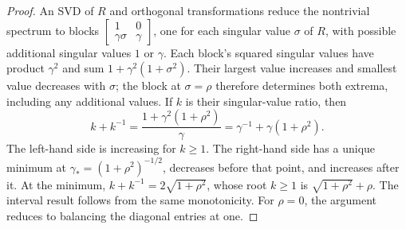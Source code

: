 \begin{proof}
An SVD of $R$ and orthogonal transformations reduce the nontrivial spectrum to
blocks $\left[\begin{smallmatrix}1&0\\\gamma\sigma&\gamma\end{smallmatrix}\right]$,
one for each singular value $\sigma$ of $R$, with possible additional singular
values $1$ or $\gamma$. Each block's squared singular values have product
$\gamma^2$ and sum $1+\gamma^2(1+\sigma^2)$. Their largest value increases and
smallest value decreases with $\sigma$; the block at $\sigma=\rho$ therefore
determines both extrema, including any additional values. If $k$ is their
singular-value ratio, then
\[
 k+k^{-1}=\frac{1+\gamma^2(1+\rho^2)}{\gamma}
 =\gamma^{-1}+\gamma(1+\rho^2).
\]
The left-hand side is increasing for $k\geq1$. The right-hand side has a unique
minimum at $\gamma_*=(1+\rho^2)^{-1/2}$, decreases before that point, and increases
after it. At the minimum, $k+k^{-1}=2\sqrt{1+\rho^2}$, whose root $k\geq1$ is
$\sqrt{1+\rho^2}+\rho$. The interval result follows from the same monotonicity.
For $\rho=0$, the argument reduces to balancing the diagonal entries at one.
\end{proof}
